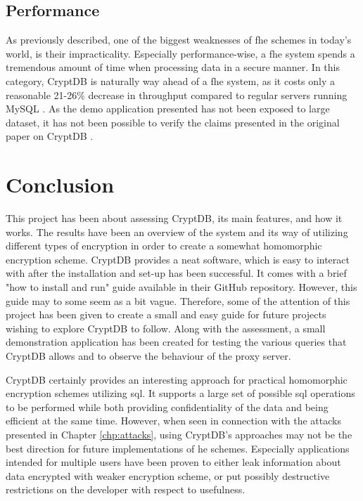\subsection{Performance}

As previously described, one of the biggest weaknesses of \gls{fhe} schemes in today's world, is their impracticality. Especially performance-wise, a \gls{fhe} system spends a tremendous amount of time when processing data in a secure manner. In this category, CryptDB is naturally way ahead of a \gls{fhe} system, as it costs only a reasonable 21-26\% decrease in throughput compared to regular servers running MySQL \cite{CryptDB_Main_Paper}. As the demo application presented has not been exposed to large dataset, it has not been possible to verify the claims presented in the original paper on CryptDB \citep{CryptDB_Main_Paper}.

\section{Conclusion}

This project has been about assessing CryptDB, its main features, and how it works. The results have been an overview of the system and its way of utilizing different types of encryption in order to create a somewhat homomorphic encryption scheme. CryptDB provides a neat software, which is easy to interact with after the installation and set-up has been successful. It comes with a brief "how to install and run" guide available in their GitHub repository. However, this guide may to some seem as a bit vague. Therefore, some of the attention of this project has been given to create a small and easy guide for future projects wishing to explore CryptDB to follow. Along with the assessment, a small demonstration application has been created for testing the various queries that CryptDB allows and to observe the behaviour of the proxy server.


CryptDB certainly provides an interesting approach for practical homomorphic encryption schemes utilizing \gls{sql}. It supports a large set of possible \gls{sql} operations to be performed while both providing confidentiality of the data and being efficient at the same time. However, when seen in connection with the attacks presented in Chapter \ref{chp:attacks}, using CryptDB's approaches may not be the best direction for future implementations of \gls{he} schemes. Especially applications intended for multiple users have been proven to either leak information about data encrypted with weaker encryption scheme, or put possibly destructive restrictions on the developer with respect to usefulness. 

